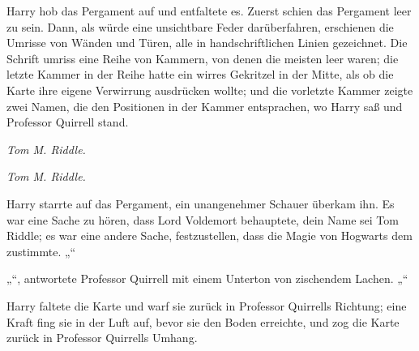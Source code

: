 Harry hob das Pergament auf und entfaltete es.
%
Zuerst schien das Pergament leer zu sein. Dann, als würde eine unsichtbare Feder darüberfahren, erschienen die Umrisse von Wänden und Türen, alle in handschriftlichen Linien gezeichnet. Die Schrift umriss eine Reihe von Kammern, von denen die meisten leer waren; die letzte Kammer in der Reihe hatte ein wirres Gekritzel in der Mitte, als ob die Karte ihre eigene Verwirrung ausdrücken wollte; und die vorletzte Kammer zeigte zwei Namen, die den Positionen in der Kammer entsprachen, wo Harry saß und Professor Quirrell stand.

\emph{Tom M. Riddle.}

\emph{Tom M. Riddle.}

Harry starrte auf das Pergament, ein unangenehmer Schauer überkam ihn. Es war eine Sache zu hören, dass Lord Voldemort behauptete, dein Name sei Tom Riddle; es war eine andere Sache, festzustellen, dass die Magie von Hogwarts dem zustimmte.
„“

„“, antwortete Professor Quirrell mit einem Unterton von zischendem Lachen. „“

Harry faltete die Karte und warf sie zurück in Professor Quirrells Richtung; eine Kraft fing sie in der Luft auf, bevor sie den Boden erreichte, und zog die Karte zurück in Professor Quirrells Umhang.

